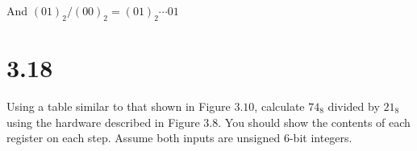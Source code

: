 \documentclass[paper=a4, fontsize=11pt]{scrartcl} %
\begin{document}
And ${(01)}_2 / {(00)}_2 = {(01)}_2 \cdots {01} $


\section{3.18}

\begin{fancyquotes}
    Using a table similar to that shown in Figure $3.10$, calculate ${74}_8$ divided by ${21}_8$ using the hardware described in Figure $3.8$. You should show the contents of each register on each step. Assume both inputs are unsigned 6-bit integers.
\end{fancyquotes}

\end{document}
